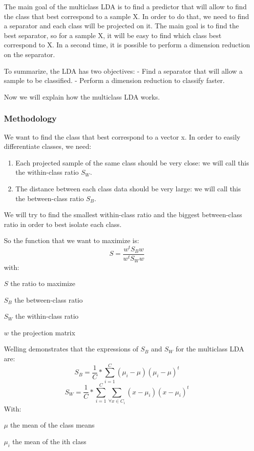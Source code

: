 The main goal of the multiclass LDA is to find a predictor that will allow to find the class that best correspond to a sample X.
In order to do that, we need to find a separator and each class will be projected on it.
The main goal is to find the best separator, so for a sample X, it will be easy to find which class
best correspond to X.
In a second time, it is possible to perform a dimension reduction on the separator.

To summarize, the LDA has two objectives:
- Find a separator that will allow a sample to be classified.
- Perform a dimension reduction to classify faster.

Now we will explain how the multiclass LDA works. 

\subsubsection{Methodology}

We want to find the class that best correspond to a vector x.
In order to easily differentiate classes, we need:

\begin{enumerate}
\item Each projected sample of the same class should be very close: we will call this the within-class ratio $S_W$.
\item The distance between each class data should be very large: we will call this the between-class ratio $S_B$.
\end{enumerate}

We will try to find the smallest within-class ratio and the biggest between-class ratio in order to best isolate each class.

So the function that we want to maximize is:
$$S = \frac{w^t S_B w}{w^t S_W w}$$
with:
\begin{itemize*}
  \item $S$ the ratio to maximize
  \item $S_B$ the between-class ratio
  \item $S_W$ the within-class ratio
  \item $w$ the projection matrix
\end{itemize*}

Welling\cite{welling} demonstrates that the expressions of $S_B$ and $S_W$ for the multiclass LDA are:
$$S_B = \frac{1}{C} * \sum\limits_{i = 1}^C (\mu_i - \mu)(\mu_i - \mu)^t$$
$$S_W = \frac{1}{C} * \sum\limits_{i = 1}^C \sum\limits_{\forall x \in C_i} (x - \mu_i)(x - \mu_i)^t$$
With:
\begin{itemize*}
  \item $\mu$ the mean of the class means
  \item $\mu_i$ the mean of the ith class
\end{itemize*}


